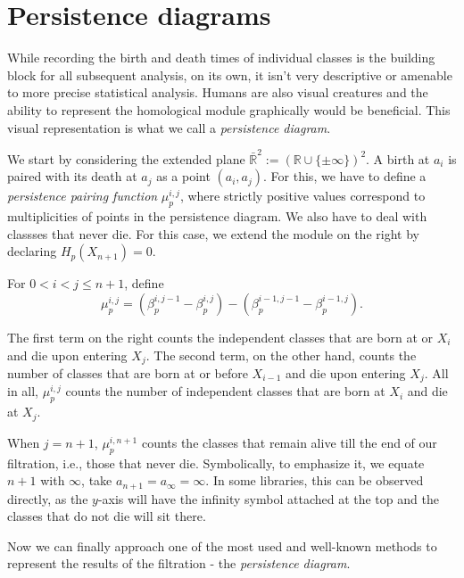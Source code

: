 \section{Persistence diagrams}
While recording the birth and death times of individual classes is the building block for all subsequent analysis, on its own, it isn't very descriptive or amenable to more precise statistical analysis. Humans are also visual creatures and the ability to represent the homological module graphically would be beneficial. This visual representation is what we call a \textit{persistence diagram}.

We start by considering the extended plane $\bar{\mathbb{R}}^{2} := (\mathbb{R} \cup \{\pm \infty\})^{2}$. A birth at $a_{i}$ is paired with its death at $a_{j}$ as a point $(a_{i}, a_{j})$. For this, we have to define a \textit{persistence pairing function} $\mu^{i,j}_{p}$, where strictly positive values correspond to multiplicities of points in the persistence diagram. We also have to deal with classses that never die. For this case, we extend the module on the right by declaring $H_{p}(X_{n+1}) = 0$.

\begin{definition}
For $0 < i < j \leq n+1$, define
  \begin{equation*}
    \mu^{i,j}_{p} = (\beta^{i, j-1}_{p} - \beta^{i,j}_{p}) - (\beta^{i-1, j-1}_{p} - \beta^{i-1, j}_{p}).
  \end{equation*}
\end{definition}

The first term on the right counts the independent classes that are born at or $X_{i}$ and die upon entering $X_{j}$. The second term, on the other hand, counts the number of classes that are born at or before $X_{i-1}$ and die upon entering $X_{j}$. All in all, $\mu^{i,j}_{p}$ counts the number of independent classes that are born at $X_{i}$ and die at $X_{j}$.

When $j = n+1$, $\mu^{i, n+1}_{p}$ counts the classes that remain alive till the end of our filtration, i.e., those that never die. Symbolically, to emphasize it, we equate $n+1$ with $\infty$, take $a_{n+1} = a_{\infty} = \infty$. In some libraries, this can be observed directly, as the $y$-axis will have the infinity symbol attached at the top and the classes that do not die will sit there.

Now we can finally approach one of the most used and well-known methods to represent the results of the filtration - the \textit{persistence diagram}.

